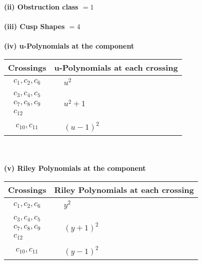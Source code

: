 \documentclass[1p]{elsarticle_modified}
\theoremstyle{definition}
\begin{document}
\flushleft \textbf{(ii) Obstruction class $= 1$}\\~\\
\flushleft \textbf{(iii) Cusp Shapes $= 4$}\\~\\
\newpage\renewcommand{\arraystretch}{1}
\flushleft \textbf{(iv) u-Polynomials at the component}\newline \\
\begin{tabular}{m{50pt}|m{274pt}}
Crossings & \hspace{64pt}u-Polynomials at each crossing \\
\hline $$\begin{aligned}c_{1},c_{2},c_{6}\end{aligned}$$&$\begin{aligned}
&u^2
\end{aligned}$\\
\hline $$\begin{aligned}c_{3},c_{4},c_{5}\\c_{7},c_{8},c_{9}\\c_{12}\end{aligned}$$&$\begin{aligned}
&u^2+1
\end{aligned}$\\
\hline $$\begin{aligned}c_{10},c_{11}\end{aligned}$$&$\begin{aligned}
&(u-1)^2
\end{aligned}$\\
\hline
\end{tabular}\\~\\
\newpage\renewcommand{\arraystretch}{1}
\flushleft \textbf{(v) Riley Polynomials at the component}\newline \\
\begin{tabular}{m{50pt}|m{274pt}}
Crossings & \hspace{64pt}Riley Polynomials at each crossing \\
\hline $$\begin{aligned}c_{1},c_{2},c_{6}\end{aligned}$$&$\begin{aligned}
&y^2
\end{aligned}$\\
\hline $$\begin{aligned}c_{3},c_{4},c_{5}\\c_{7},c_{8},c_{9}\\c_{12}\end{aligned}$$&$\begin{aligned}
&(y+1)^2
\end{aligned}$\\
\hline $$\begin{aligned}c_{10},c_{11}\end{aligned}$$&$\begin{aligned}
&(y-1)^2
\end{aligned}$\\
\hline
\end{tabular}\\~\\
\end{document}
